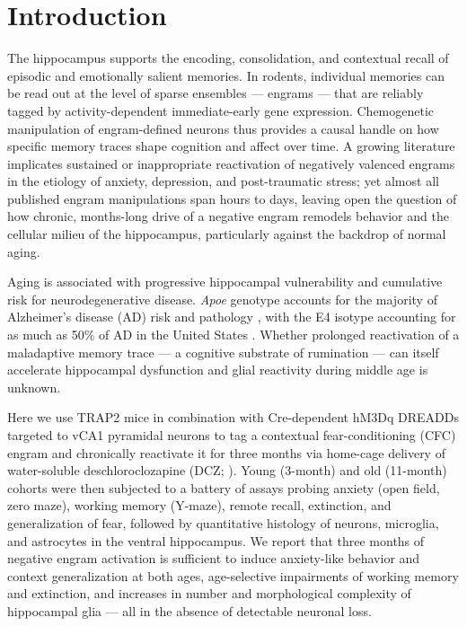 \documentclass[11pt]{article}
\begin{document}
\section{Introduction}
The hippocampus supports the encoding, consolidation, and contextual recall of episodic and emotionally salient memories. In rodents, individual memories can be read out at the level of sparse ensembles --- engrams --- that are reliably tagged by activity-dependent immediate-early gene expression. Chemogenetic manipulation of engram-defined neurons thus provides a causal handle on how specific memory traces shape cognition and affect over time. A growing literature implicates sustained or inappropriate reactivation of negatively valenced engrams in the etiology of anxiety, depression, and post-traumatic stress; yet almost all published engram manipulations span hours to days, leaving open the question of how chronic, months-long drive of a negative engram remodels behavior and the cellular milieu of the hippocampus, particularly against the backdrop of normal aging.

Aging is associated with progressive hippocampal vulnerability and cumulative risk for neurodegenerative disease. \emph{Apoe} genotype accounts for the majority of Alzheimer's disease (AD) risk and pathology \citep{johnson2015,schuff2009}, with the E4 isotype accounting for as much as 50\% of AD in the United States \citep{raber2003}. Whether prolonged reactivation of a maladaptive memory trace --- a cognitive substrate of rumination --- can itself accelerate hippocampal dysfunction and glial reactivity during middle age is unknown.

Here we use TRAP2 mice \citep{denardo2019,monasterio2024} in combination with Cre-dependent hM3Dq DREADDs targeted to vCA1 pyramidal neurons to tag a contextual fear-conditioning (CFC) engram and chronically reactivate it for three months via home-cage delivery of water-soluble deschloroclozapine (DCZ; \citealt{nagai2020,suthard2023}). Young (3-month) and old (11-month) cohorts were then subjected to a battery of assays probing anxiety (open field, zero maze), working memory (Y-maze), remote recall, extinction, and generalization of fear, followed by quantitative histology of neurons, microglia, and astrocytes in the ventral hippocampus. We report that three months of negative engram activation is sufficient to induce anxiety-like behavior and context generalization at both ages, age-selective impairments of working memory and extinction, and increases in number and morphological complexity of hippocampal glia --- all in the absence of detectable neuronal loss.
\end{document}
